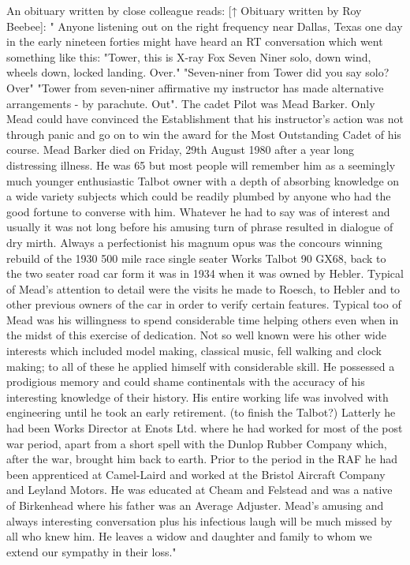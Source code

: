 An obituary written by close colleague reads:    [↑ Obituary written by Roy Beebee]:
   " Anyone listening out on the right frequency near Dallas, Texas one day in the early nineteen forties might have heard an RT conversation which went something like this:
    "Tower, this is X-ray Fox Seven Niner solo, down wind, wheels down, locked landing. Over."
    "Seven-niner from Tower did you say solo? Over" "Tower from seven-niner affirmative my instructor has made alternative arrangements - by parachute. Out". The cadet Pilot was Mead Barker.
    Only Mead could have convinced the Establishment that his instructor's action was not through panic and go on to win the award for the Most Outstanding Cadet of his course.
    Mead Barker died on Friday, 29th August 1980 after a year long distressing illness. He was 65 but most people will remember him as a seemingly much younger enthusiastic Talbot owner with a depth of absorbing knowledge on a wide variety subjects which could be readily plumbed by anyone who had the good fortune to converse with him.
    Whatever he had to say was of interest and usually it was not long before his amusing turn of phrase resulted in dialogue of dry mirth.
    Always a perfectionist his magnum opus was the concours winning rebuild of the 1930 500 mile race single seater Works Talbot 90 GX68, back to the two seater road car form it was in 1934 when it was owned by Hebler.
    Typical of Mead's attention to detail were the visits he made to Roesch, to Hebler and to other previous owners of the car in order to verify certain features.
    Typical too of Mead was his willingness to spend considerable time helping others even when in the midst of this exercise of dedication.
    Not so well known were his other wide interests which included model making, classical music, fell walking and clock making; to all of these he applied himself with considerable skill. He possessed a prodigious memory and could shame continentals with the accuracy of his interesting knowledge of their history.
    His entire working life was involved with engineering until he took an early retirement. (to finish the Talbot?) Latterly he had been Works Director at Enots Ltd. where he had worked for most of the post war period, apart from a short spell with the Dunlop Rubber Company which, after the war, brought him back to earth.
    Prior to the period in the RAF he had been apprenticed at Camel-Laird and worked at the Bristol Aircraft Company and Leyland Motors. He was educated at Cheam and Felstead and was a native of Birkenhead where his father was an Average Adjuster.
    Mead's amusing and always interesting conversation plus his infectious laugh will be much missed by all who knew him. He leaves a widow and daughter and family to whom we extend our sympathy in their loss."





